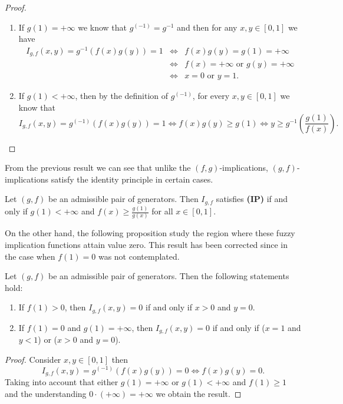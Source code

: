 \begin{proof}\hspace{0.5cm}
	\begin{enumerate}[label=(\roman*)]
		\item If $g(1)=+\infty$ we know that $g^{(-1)}=g^{-1}$ and then for any $x,y \in [0,1]$ we have
		\begin{eqnarray*}
			I_{g,f}(x,y)=g^{-1}(f(x)g(y))=1 & \Leftrightarrow & f(x)g(y)=g(1)=+ \infty \\  & \Leftrightarrow &  f(x) = + \infty \text{ or } g(y)= + \infty \\
			& \Leftrightarrow &x=0 \text{ or } y=1.
		\end{eqnarray*}
		\item If $g(1) < + \infty$, then by the definition of $g^{(-1)}$, for every $x,y \in [0,1]$ we know that
		$$I_{g,f}(x,y)=g^{(-1)}(f(x)g(y))=1 \Leftrightarrow f(x)g(y) \geq g(1) \Leftrightarrow y \geq g^{-1}\left(\frac{g(1)}{f(x)}\right).$$
	\end{enumerate}
\end{proof}

From the previous result we can see that unlike the $(f,g)$-implications, $(g,f)$-implications satisfy the identity principle in certain cases.

\begin{corollary}\label{cor:(g,f)(IP)}
Let $(g,f)$ be an admissible pair of generators. Then $I_{g,f}$ satisfies {\bf (IP)} if and only if $g(1) < + \infty$ and $f(x) \geq \frac{g(1)}{g(x)}$ for all $x \in [0,1]$.
\end{corollary}

On the other hand, the following proposition study the region where these fuzzy implication functions attain value zero. This result has been corrected since in \cite[Proposition 9]{Massanet2013B} the case when $f(1)=0$ was not contemplated.

\begin{proposition} Let $(g,f)$ be an admissible pair of generators. Then the following statements hold:
	\begin{enumerate}[label=(\roman*)]
		\item If $f(1)>0$, then $I_{g,f}(x,y)=0$ if and only if $x>0$ and $y=0$.
		\item If $f(1)=0$ and $g(1)=+\infty$, then $I_{g,f}(x,y)=0$ if and only if ($x=1$ and $y<1$) or ($x>0$ and $y=0$).
	\end{enumerate}
\end{proposition}
\begin{proof}
	Consider $x,y \in [0,1]$ then
	$$I_{g,f}(x,y)=g^{(-1)}(f(x)g(y))=0 \Leftrightarrow f(x)g(y)=0.$$
	Taking into account that either $g(1)=+\infty$ or $g(1)<+\infty$ and $f(1) \geq 1$ and the understanding $0 \cdot (+\infty)=+\infty$ we obtain the result.
\end{proof}


